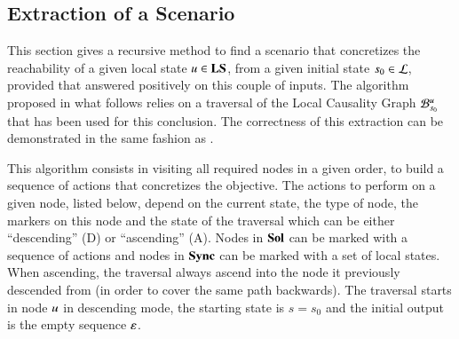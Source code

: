 \subsection{Extraction of a Scenario}
\label{ssec:concret}

This section gives a recursive method to find a scenario that concretizes
the reachability of a given local state $u \in \mathbf{LS}$,
from a given initial state $s_0 \in \mathcal{L}$,
provided that  answered positively on this couple of inputs.
The algorithm proposed in what follows relies on a traversal of the Local Causality Graph
${\mathcal{B}_{s_0}^{u}}$ that has been used for this conclusion.
The correctness of this extraction can be demonstrated
in the same fashion as .

This algorithm consists in visiting all required nodes in a given order,
to build a sequence of actions that concretizes the objective.
The actions to perform on a given node,
listed below,
depend on the current state, the type of node, the markers on this node
and the state of the traversal which can be either “descending” (D) or “ascending” (A).
Nodes in $\mathbf{Sol}$ can be marked with a sequence of actions
and nodes in $\mathbf{Sync}$ can be marked with a set of local states.
When ascending, the traversal always ascend into the node it previously descended from
(in order to cover the same path backwards).
The traversal starts in node $u$ in descending mode,
the starting state is $s = s_0$
and the initial output is the empty sequence $\varepsilon$.

